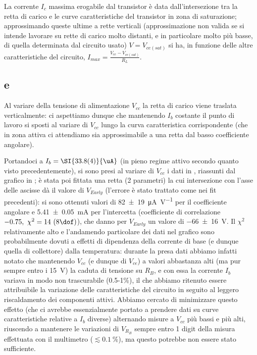 La corrente $I_c$ massima erogabile dal transistor è data dall'intersezione tra la retta di carico e le curve caratteristiche del transistor in zona di saturazione; approssimando queste ultime a rette verticali (approssimazione non valida se si intende lavorare su rette di carico molto distanti, e in particolare molto più basse, di quella determinata dal circuito usato) $V = V_{ce(sat)}$ si ha, in funzione delle altre caratteristiche del circuito, $I_{max} = \frac{V_{cc} - V_{ce(sat)}}{R_L}$.

\subsection{e}
Al variare della tensione di alimentazione $V_{cc}$ la retta di carico viene traslata verticalmente: ci aspettiamo dunque che mantenendo $I_b$ costante il punto di lavoro si sposti al variare di $V_{cc}$ lungo la curva caratteristica corrispondente (che in zona attiva ci attendiamo sia approssimabile a una retta dal basso coefficiente angolare).

Portandoci a $I_b = \SI{33.8 (4)}{\uA}$ (in pieno regime attivo secondo quanto visto precedentemente), si sono presi al variare di $V_{cc}$ i dati in , riassunti dal grafico in ; è stata poi fittata una retta (2 parametri) la cui intersezione con l'asse delle ascisse dà il valore di $V_{Early}$ (l'errore è stato trattato come nei fit precedenti): si sono ottenuti valori di \SI{82(19)}{\micro\A\per\volt} per il coefficiente angolare e \SI{5.41(5)}{\milli\ampere} per l'intercetta (coefficiente di correlazione $-0.75, \ \chi^2 = 14 \ (8 \dof)$), che danno per $V_{Early}$ un valore di \SI{-66 \pm 16}{\V}. Il $\chi^2$ relativamente alto e l'andamendo particolare dei dati nel grafico sono probabilmente dovuti a effetti di dipendenza della corrente di base (e dunque quella di collettore) dalla temperatura: durante la presa dati abbiamo infatti notato che mantenendo $V_{cc}$ (e dunque di $V_{ce}$) a valori abbastanza alti (ma pur sempre entro i \SI{15}{\V}) la caduta di tensione su $R_B$, e con essa la corrente $I_b$ variava in modo non trascurabile (0.5-1\si{\percent}), il che abbiamo ritenuto essere attribuibile la variazione delle caratteristiche del circuito in seguito al leggero riscaldamento dei componenti attivi. Abbiamo cercato di minimizzare questo effetto (che ci avrebbe essenzialmente portato a prendere dati su curve caratteristiche relative a $I_b$ diverse) alternando misure a $V_{cc}$ più bassi e più alti, riuscendo a mantenere le variazioni di $V_{R_B}$ sempre entro 1 digit della misura effettuata con il multimetro ($\lesssim \SI{0.1}{\percent}$), ma questo potrebbe non essere stato sufficiente.

